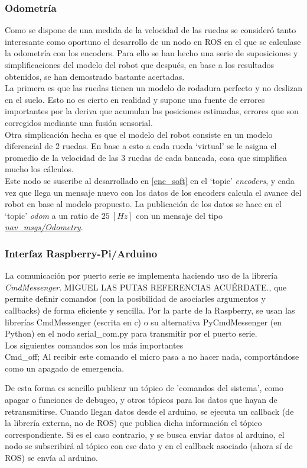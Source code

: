 \subsubsection{Odometría}
Como se dispone de una medida de la velocidad de las ruedas se consideró tanto interesante como oportuno el desarrollo de un nodo en ROS en el que se calculase la odometría con los encoders.
Para ello se han hecho una serie de suposiciones y simplificaciones del modelo del robot que después, en base a los resultados obtenidos, se han demostrado bastante acertadas.\\
La primera es que las ruedas tienen un modelo de rodadura perfecto y no deslizan en el suelo. Esto no es cierto en realidad y supone una fuente de errores importantes por la deriva que acumulan las posiciones estimadas, errores que son corregidos mediante una fusión sensorial.\\
Otra simplicación hecha es que el modelo del robot consiste en un modelo diferencial de 2 ruedas. En base a esto a cada rueda `virtual' se le asigna el promedio de la velocidad de las 3 ruedas de cada bancada, cosa que simplifica mucho los cálculos.\\

Este nodo se suscribe al desarrollado en \ref{enc_soft} en el `topic' \textit{encoders}, y cada vez que llega un mensaje nuevo con los datos de los 
encoders calcula el avance del robot en base al modelo propuesto. La publicación de los datos se hace en el `topic' \textit{odom} a un ratio de $25\ [Hz]$ 
con un mensaje del tipo \textit{\href{http://docs.ros.org/melodic/api/nav_msgs/html/msg/Odometry.html}{nav\_msgs/Odometry}}.

\subsubsection{Interfaz Raspberry-Pi/Arduino}
La comunicación por puerto serie se implementa haciendo uso de la librería \textit{CmdMessenger}. MIGUEL LAS PUTAS REFERENCIAS ACUÉRDATE., que permite definir comandos (con la posibilidad de asociarles argumentos y callbacks) de forma eficiente y sencilla.
Por la parte de la Raspberry, se usan las librerías CmdMessenger (escrita en c) o su alternativa PyCmdMessenger (en Python) en el nodo serial\_com.py para transmitir por el puerto serie.\\
Los siguientes comandos son los más importantes \\
Cmd\_off; Al recibir este comando el micro pasa a no hacer nada, comportándose como un apagado de emergencia. \par
De esta forma es sencillo publicar un tópico de 'comandos del sistema', como apagar o funciones de debugeo, y otros tópicos para los datos que hayan de retransmitirse. Cuando llegan datos desde el arduino, se ejecuta un callback (de la librería externa, no de ROS) que publica dicha información el tópico correspondiente. Si es el caso contrario, y se busca enviar datos al arduino, el nodo se subscribirá al tópico con ese dato y en el callback asociado (ahora sí de ROS) se envía al arduino.

